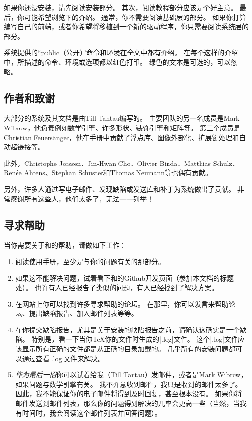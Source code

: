 如果你还没安装\tikzname，请先阅读安装部分。
其次，阅读教程部分应该是个好主意。
最后，你可能希望浏览下\tikzname 的介绍。
通常，你不需要阅读基础层的部分。
如果你打算编写自己的前端，或者你希望将\pgfname 移植到一个新的驱动程序，你只需要阅读系统层的部分。

系统提供的“public（公开）”命令和环境在全文中都有介绍。
在每个这样的介绍中，所描述的命令、环境或选项都以红色打印。
绿色的文本是可选的，可以忽略。


\subsection{作者和致谢}
\label{section-authors}

大部分的\pgfname 系统及其文档是由Till Tantau编写的。
主要团队的另一名成员是Mark Wibrow，他负责例如\pgfname 数学引擎、许多形状、装饰引擎和矩阵等。
第三个成员是Christian Feuers\"anger，他在手册中贡献了浮点库、图像外部化、扩展键处理和自动超链接等。

此外，Christophe Jorssen、Jin-Hwan Cho、Olivier Binda、Matthias Schulz、Ren\'ee Ahrens、Stephan Schuster和Thomas Neumann等也偶有贡献。

另外，许多人通过写电子邮件、发现缺陷或发送库和补丁为\pgfname 系统做出了贡献。
非常感谢所有这些人，他们太多了，无法一一列举！


\subsection{寻求帮助}

当你需要关于\pgfname 和\tikzname 的帮助，请做如下工作：

\begin{enumerate}
    \item 阅读使用手册，至少是与你的问题有关的那部分。
    \item 如果这不能解决问题，试着看下\pgfname 和\tikzname 的Github开发页面（参加本文档的标题处）。
        也许有人已经报告了类似的问题，有人已经找到了解决方案。
    \item 在网站上你可以找到许多寻求帮助的论坛。
        在那里，你可以发言来帮助论坛、提出缺陷报告、加入邮件列表等等。
    \item 在你提交缺陷报告，尤其是关于安装的缺陷报告之前，请确认这确实是一个缺陷。
        特别是，看一下当你\TeX 你的文件时生成的|.log|文件。
        这个|.log|文件应该显示所有正确的文件都是从正确的目录加载的。
        几乎所有的安装问题都可以通过查看|.log|文件来解决。
    \item \emph{作为最后一招}你可以试着给我（Till Tantau）发邮件，或者是Mark Wibrow，如果问题与数学引擎有关。
        我不介意收到邮件，我只是收到的邮件太多了。
        因此，我不能保证你的电子邮件将得到及时回复，甚至根本没有。
        如果你将邮件发送到\pgfname 邮件列表，那么你的问题得到解决的几率会更高一些（当然，当我有时间时，我会阅读这个邮件列表并回答问题）。
\end{enumerate}

